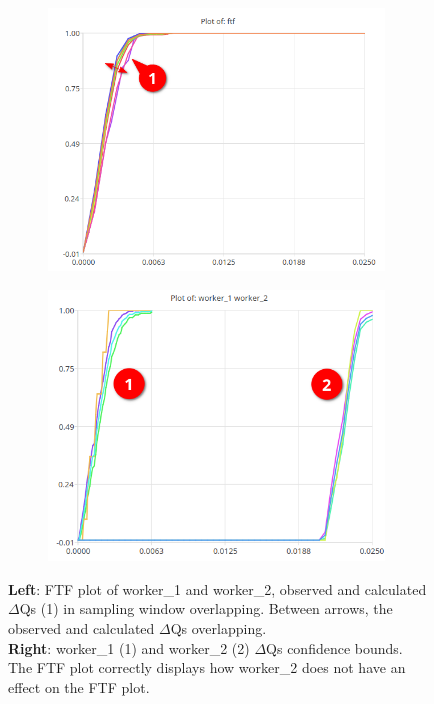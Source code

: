             \begin{figure}[H]
                \centering 
                \begin{subfigure}{.5\textwidth}
                    \centering
                    \includegraphics[width =0.98\textwidth]{img/ftfa.png}
                    \label{fig:ftf_art_d}
                \end{subfigure}%
                \begin{subfigure}{.5\textwidth}%
                    \centering%
                    \includegraphics[width =0.98\textwidth]{img/delay32.png}%
                    \label{fig:ftf_art_dw}%
                \end{subfigure}%
                \caption{\textbf{Left}: FTF plot of worker\_1 and worker\_2, observed and calculated $\Delta$Qs (1) in sampling window overlapping. Between arrows, the observed and calculated $\Delta$Qs overlapping.\\
                \textbf{Right}: worker\_1 (1) and worker\_2 (2) $\Delta$Qs confidence bounds. \\
                The FTF plot correctly displays how worker\_2 does not have an effect on the FTF plot.}
                \label{fig:ftf_w1w2}%
            \end{figure}%

